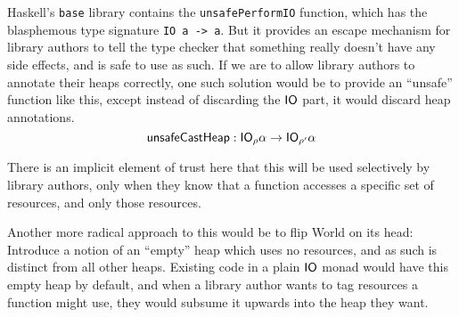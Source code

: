Haskell's \texttt{base} library contains the
\texttt{unsafePerformIO} function, which has the
blasphemous type signature \texttt{IO a -> a}. But it
provides an escape mechanism for library authors to tell the type
checker that something really doesn't have any side effects, and is
safe to use as such. If we are to allow library authors to annotate
their heaps correctly, one such solution would be to provide an
``unsafe'' function like this, except instead of discarding the $\mathsf{IO}$
part, it would discard heap annotations.
\[ \textsf{unsafeCastHeap} : \mathsf{IO}_\rho \alpha \rightarrow \mathsf{IO}_{\rho'} \alpha \]

There is an
implicit element of trust here that this will be used selectively by
library authors, only when they know that a function accesses a
specific set of resources, and only those resources.

Another more radical approach to this would be to flip \textsf{World}
on its head: Introduce a notion of an ``empty'' heap which uses no
resources, and as such is distinct from all other heaps. Existing code
in a plain $\mathsf{IO}$ monad would have this empty heap by default, and when a
library author wants to tag resources a function might use, they would
subsume it upwards into the heap they want.


